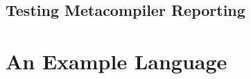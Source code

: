 \subsection{Testing Metacompiler Reporting} %
\label{sub:testing_metacompiler_reporting}



\section{An Example Language} %
\label{sec:an_example_language}


